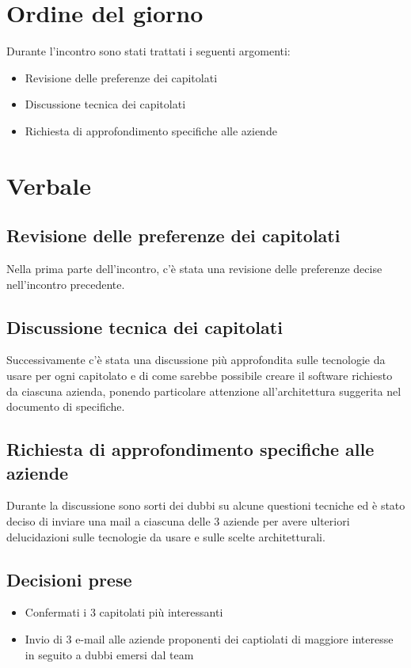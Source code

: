 \documentclass[italian, 12pt]{article}
\begin{document}
\section{Ordine del giorno}
Durante l'incontro sono stati trattati i seguenti argomenti: 
\begin{flushleft}
        \begin{itemize}
            \item Revisione delle preferenze dei capitolati
            \item Discussione tecnica dei capitolati 
            \item Richiesta di approfondimento specifiche alle aziende
        \end{itemize}
\end{flushleft}
\newpage

\section{Verbale}
\subsection{Revisione delle preferenze dei capitolati}
Nella prima parte dell'incontro, c'è stata una revisione delle preferenze decise nell'incontro precedente.

\subsection{Discussione tecnica dei capitolati}
Successivamente c'è stata una discussione più approfondita sulle tecnologie da usare per ogni capitolato e di come sarebbe possibile creare il software richiesto da ciascuna azienda, ponendo particolare attenzione all'architettura suggerita nel documento di specifiche.

\subsection{Richiesta di approfondimento specifiche alle aziende}
Durante la discussione sono sorti dei dubbi su alcune questioni tecniche ed è stato deciso di inviare una mail a ciascuna delle 3 aziende per avere ulteriori delucidazioni sulle tecnologie da usare e sulle scelte architetturali.

\subsection{Decisioni prese}
\begin{itemize}
    \item Confermati i 3 capitolati più interessanti
    \item Invio di 3 e-mail alle aziende proponenti dei captiolati di maggiore interesse in seguito a dubbi emersi dal team
\end{itemize}
\end{document}
